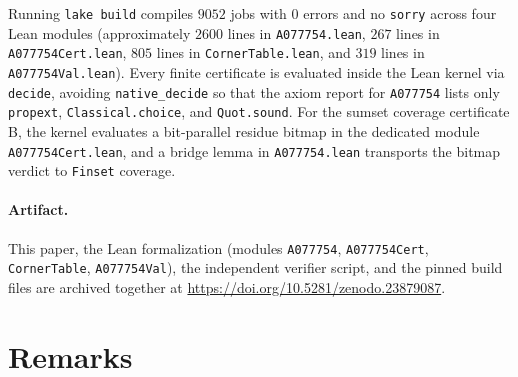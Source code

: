 \documentclass[11pt]{article}
\theoremstyle{remark}
\begin{document}
Running \texttt{lake build} compiles $9052$ jobs with $0$ errors and no
\texttt{sorry} across four Lean modules (approximately $2600$ lines in
\texttt{A077754.lean}, $267$ lines in \texttt{A077754Cert.lean}, $805$ lines in
\texttt{CornerTable.lean}, and $319$ lines in \texttt{A077754Val.lean}). Every
finite certificate is evaluated inside the Lean kernel via \texttt{decide},
avoiding \texttt{native\_decide} so that the axiom report
for \texttt{A077754} lists only
\texttt{propext}, \texttt{Classical.choice}, and \texttt{Quot.sound}. For the
sumset coverage certificate B, the kernel evaluates a bit-parallel residue
bitmap in the dedicated module \texttt{A077754Cert.lean}, and a bridge lemma in
\texttt{A077754.lean} transports the bitmap verdict to \texttt{Finset}
coverage.

\paragraph{Artifact.} This paper, the Lean formalization
(modules \texttt{A077754}, \texttt{A077754Cert},
\texttt{CornerTable}, \texttt{A077754Val}), the independent
verifier script, and the pinned build files are archived
together at \url{https://doi.org/10.5281/zenodo.23879087}.

\section{Remarks}
\end{document}
